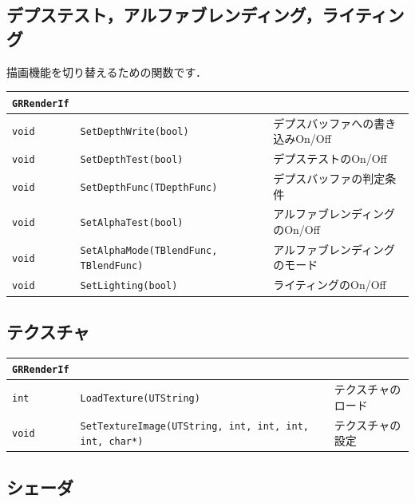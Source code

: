 \subsection*{\KLUDGE デプステスト，アルファブレンディング，ライティング}

\KLUDGE 描画機能を切り替えるための関数です．

\begin{center}
\begin{tabular}{p{.1\hsize}p{.4\hsize}p{.4\hsize}}
\texttt{GRRenderIf}									&										\\ \midrule
\texttt{void} & \texttt{SetDepthWrite(bool)}					& \KLUDGE デプスバッファへの書き込みOn/Off		\\
\texttt{void} & \texttt{SetDepthTest(bool)}						& \KLUDGE デプステストのOn/Off					\\
\texttt{void} & \texttt{SetDepthFunc(TDepthFunc)}				& \KLUDGE デプスバッファの判定条件				\\
\texttt{void} & \texttt{SetAlphaTest(bool)}						& \KLUDGE アルファブレンディングのOn/Off		\\
\texttt{void} & \texttt{SetAlphaMode(TBlendFunc, TBlendFunc)}	& \KLUDGE アルファブレンディングのモード		\\
\texttt{void} & \texttt{SetLighting(bool)}						& \KLUDGE ライティングのOn/Off					\\
\end{tabular}
\end{center}

\subsection*{\KLUDGE テクスチャ}

\begin{center}
\begin{tabular}{p{.15\hsize}p{.45\hsize}p{.3\hsize}}
\texttt{GRRenderIf}														&						\\ \midrule
\texttt{int} 	& \texttt{LoadTexture(UTString)}										& \KLUDGE テクスチャのロード	\\
\texttt{void} 	& \texttt{SetTextureImage(UTString, int, int, int, int, char*)}		& \KLUDGE テクスチャの設定		\\
\end{tabular}
\end{center}

\subsection*{\KLUDGE シェーダ}

